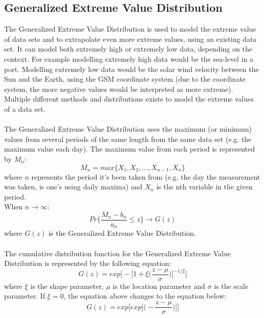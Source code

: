 \documentclass[11pt]{article}
\begin{document}
    \subsection{Generalized Extreme Value Distribution}\label{sec:gev}
        The Generalized Extreme Value Distribution is used to model the extreme value of data sets and to extrapolate even more extreme values, using an existing data set. It can model both extremely high or extremely low data, depending on the context. For example modelling extremely high data would be the sea-level in a port. Modelling extremely low data would be the solar wind velocity between the Sun and the Earth, using the GSM coordinate system (due to the coordinate system, the more negative values would be interpreted as more extreme). Multiple different methods and distributions exists to model the extreme values of a data set.\\ \\
        The Generalized Extreme Value Distribution uses the maximum (or minimum) values from several periods of the same length from the same data set (e.g. the maximum value each day). The maximum value from each period is represented by $M_n$:
        \begin{equation}
            M_n = max\{X_1, X_2, ..., X_{n-1}, X_n\}
        \end{equation}
        where $n$ represents the period it's been taken from (e.g. the day the measurement was taken, is one's using daily maxima) and $X_n$ is the nth variable in the given period.\\
        When $n\rightarrow \infty$:
        \begin{equation}
            Pr\Bigg\{ \frac{M_n - b_n}{a_n} \leq z\Bigg\} \rightarrow G(z)
        \end{equation}
        where $G(z)$ is the Generalized Extreme Value Distribution\cite{2001coles}.\\ \\
        The cumulative distribution function for the Generalized Extreme Value Distribution is represented by the following equation\cite{2001coles}:
        \begin{equation}
            G(z) = exp\Bigg [-\Bigg [1+\xi \Bigg (\frac{z-\mu}{\sigma}\Bigg )\Bigg ]^{-1/\xi}\Bigg ]
        \end{equation}
        where $\xi$ is the shape parameter, $\mu$ is the location parameter and $\sigma$ is the scale parameter. If $\xi=0$, the equation above changes to the equation below:
        \begin{equation}
            G(z) = exp\Bigg [exp\Bigg [\Bigg (-\frac{z-\mu}{\sigma}\Bigg )\Bigg ]\Bigg ]
        \end{equation}\\
\end{document}
